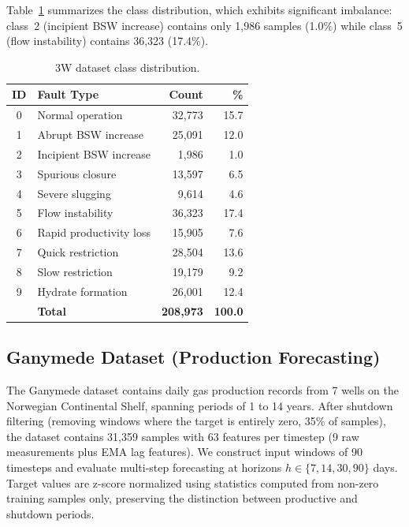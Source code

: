 \documentclass[conference]{IEEEtran}
\begin{document}
Table~\ref{tab:3w_dist} summarizes the class distribution, which exhibits significant imbalance: class~2 (incipient BSW increase) contains only 1{,}986 samples (1.0\%) while class~5 (flow instability) contains 36{,}323 (17.4\%).

\begin{table}[t]
\centering
\caption{3W dataset class distribution.}
\label{tab:3w_dist}
\small
\setlength{\tabcolsep}{3pt}
\begin{tabular}{@{}cl rr @{}}
\toprule
\textbf{ID} & \textbf{Fault Type} & \textbf{Count} & \textbf{\%} \\
\midrule
0 & Normal operation        & 32{,}773 & 15.7 \\
1 & Abrupt BSW increase     & 25{,}091 & 12.0 \\
2 & Incipient BSW increase  &  1{,}986 &  1.0 \\
3 & Spurious closure        & 13{,}597 &  6.5 \\
4 & Severe slugging         &  9{,}614 &  4.6 \\
5 & Flow instability        & 36{,}323 & 17.4 \\
6 & Rapid productivity loss & 15{,}905 &  7.6 \\
7 & Quick restriction       & 28{,}504 & 13.6 \\
8 & Slow restriction        & 19{,}179 &  9.2 \\
9 & Hydrate formation       & 26{,}001 & 12.4 \\
\midrule
  & \textbf{Total}          & \textbf{208{,}973} & \textbf{100.0} \\
\bottomrule
\end{tabular}
\end{table}

\subsection{Ganymede Dataset (Production Forecasting)}

The Ganymede dataset contains daily gas production records from 7 wells on the Norwegian Continental Shelf, spanning periods of 1 to 14 years. After shutdown filtering (removing windows where the target is entirely zero, 35\% of samples), the dataset contains 31{,}359 samples with 63 features per timestep (9 raw measurements plus EMA lag features). We construct input windows of 90 timesteps and evaluate multi-step forecasting at horizons $h \in \{7, 14, 30, 90\}$ days. Target values are z-score normalized using statistics computed from non-zero training samples only, preserving the distinction between productive and shutdown periods.
\end{document}
